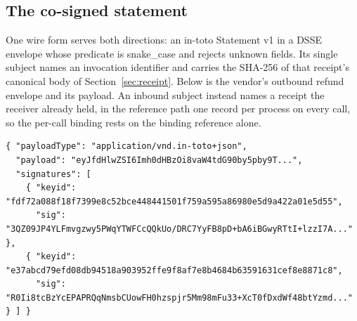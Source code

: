 \subsection{The co-signed statement}

One wire form serves both directions: an in-toto Statement v1 \cite{intoto} in
a DSSE envelope \cite{dsse} whose predicate is snake\_case and rejects unknown
fields. Its single subject names an invocation identifier and carries the
SHA-256 of that receipt's canonical body of Section~\ref{sec:receipt}. Below is
the vendor's outbound refund envelope and its payload.
An inbound subject instead names a receipt the receiver already held, in the
reference path one record per process on every call, so the per-call binding
rests on the binding reference alone.
\begin{lstlisting}
{ "payloadType": "application/vnd.in-toto+json",
  "payload": "eyJfdHlwZSI6Imh0dHBzOi8vaW4tdG90by5pby9T...",
  "signatures": [
    { "keyid": "fdf72a088f18f7399e8c52bce448441501f759a595a86980e5d9a422a01e5d55",
      "sig": "3QZ09JP4YLFmvgzwy5PWqYTWFCcQQkUo/DRC7YyFB8pD+bA6iBGwyRTtI+lzzI7A..." },
    { "keyid": "e37abcd79efd08db94518a903952ffe9f8af7e8b4684b63591631cef8e8871c8",
      "sig": "R0Ii8tcBzYcEPAPRQqNmsbCUowFH0hzspjr5Mm98mFu33+XcT0fDxdWf48btYzmd..." } ] }
\end{lstlisting}

